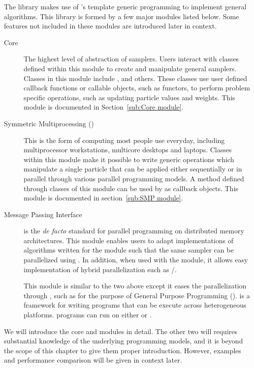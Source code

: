 The \vsmc library makes use of \cpp's template generic programming to
implement general \smc algorithms. This library is formed by a few major
modules listed below. Some features not included in these modules are
introduced later in context.
\begin{description}
  \item[Core] The highest level of abstraction of \smc samplers. Users
    interact with classes defined within this module to create and manipulate
    general \smc samplers. Classes in this module include ,
     and others. These classes use user defined callback
    functions or callable objects, such as functors, to perform problem
    specific operations, such as updating particle values and weights. This
    module is documented in Section~\ref{sub:Core module}.
  \item[Symmetric Multiprocessing (\smp)] This is the form of computing most
    people use everyday, including multiprocessor workstations, multicore
    desktops and laptops. Classes within this module make it possible to write
    generic operations which manipulate a single particle that can be applied
    either sequentially or in parallel through various parallel programming
    models. A method defined through classes of this module can be used by
     as callback objects. This module is documented in
    section~\ref{sub:SMP module}.
  \item[Message Passing Interface] \mpi is the \emph{de facto} standard for
    parallel programming on distributed memory architectures. This module
    enables users to adapt implementations of algorithms written for the \smp
    module such that the same sampler can be parallelized using \mpi. In
    addition, when used with the \smp module, it allows easy implementation of
    hybrid parallelization such as \mpi/\openmp.
  \item[\opencl] This module is similar to the two above except it eases the
    parallelization through \opencl, such as for the purpose of General
    Purpose \gpu Programming (\gpgpu). \opencl is a framework for writing
    programs that can be execute across heterogeneous platforms. \opencl
    programs can run on either \cpu or \gpu.
\end{description}
We will introduce the core and \smp modules in detail. The other two will
requires substantial knowledge of the underlying programming models, and it is
beyond the scope of this chapter to give them proper introduction. However,
examples and performance comparison will be given in context later.


